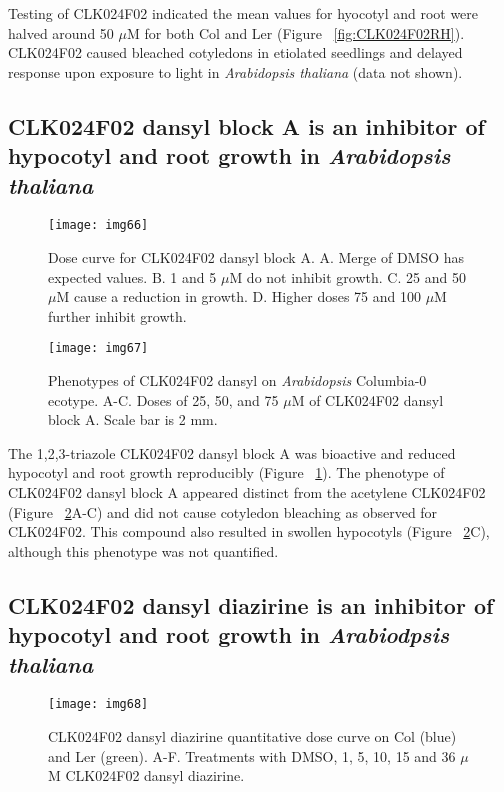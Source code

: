 Testing of CLK024F02 indicated the mean values for hyocotyl and root were halved around 50 $\mu$M for both Col and Ler (Figure ~\ref{fig:CLK024F02RH}). CLK024F02 caused bleached cotyledons in etiolated seedlings and delayed response upon exposure to light in {\it Arabidopsis thaliana} (data not shown).


\subsection{CLK024F02 dansyl block A is an inhibitor of hypocotyl and root growth in {\it Arabidopsis thaliana}}


\begin{figure}
\centering
\texttt{[image: img66]}
\caption{Dose curve for CLK024F02 dansyl block A. A. Merge of DMSO has expected values. B. 1 and 5 $\mu$M do not inhibit growth. C. 25 and 50 $\mu$M cause a reduction in growth. D. Higher doses 75 and 100 $\mu$M further inhibit growth.}
\label{fig:CLK024F02D}
\end{figure}

\begin{figure}
\texttt{[image: img67]}
\caption{Phenotypes of CLK024F02 dansyl on {\it Arabidopsis} Columbia-0 ecotype. A-C. Doses of 25, 50, and 75 $\mu$M of CLK024F02 dansyl block A. Scale bar is 2 mm.}
\label{fig:CLK024F02DoseCurvePretty}
\end{figure}

The 1,2,3-triazole CLK024F02 dansyl block A was bioactive and reduced hypocotyl and root growth reproducibly (Figure ~\ref{fig:CLK024F02D}). The phenotype of CLK024F02 dansyl block A appeared distinct from the acetylene CLK024F02 (Figure ~\ref{fig:CLK024F02DoseCurvePretty}A-C) and did not cause cotyledon bleaching as observed for CLK024F02. This compound also resulted in swollen hypocotyls (Figure ~\ref{fig:CLK024F02DoseCurvePretty}C), although this phenotype was not quantified.


\subsection{CLK024F02 dansyl diazirine is an inhibitor of hypocotyl and root growth in {\it Arabiodpsis thaliana}}

\begin{figure}
\centering
\texttt{[image: img68]}
\caption{CLK024F02 dansyl diazirine quantitative dose curve on Col (blue) and Ler (green). A-F. Treatments with DMSO, 1, 5, 10, 15 and 36 $\mu$M CLK024F02 dansyl diazirine.}
\label{fig:CLK024F02DD}
\end{figure}

